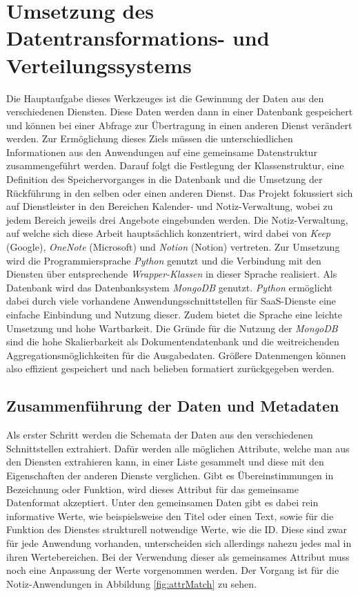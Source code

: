 \chapter{Umsetzung des Datentransformations- und Verteilungssystems}

Die Hauptaufgabe dieses Werkzeuges ist die Gewinnung der Daten aus den verschiedenen Diensten. Diese Daten werden dann in einer Datenbank gespeichert und können bei einer Abfrage zur Übertragung in einen anderen Dienst verändert werden. Zur Ermöglichung dieses Ziels müssen die unterschiedlichen Informationen aus den Anwendungen auf eine gemeinsame Datenstruktur zusammengeführt werden. Darauf folgt die Festlegung der Klassenstruktur, eine Definition des Speichervorganges in die Datenbank und die Umsetzung der Rückführung in den selben oder einen anderen Dienst. Das Projekt fokussiert sich auf Dienstleister in den Bereichen Kalender- und Notiz-Verwaltung, wobei zu jedem Bereich jeweils drei Angebote eingebunden werden. Die Notiz-Verwaltung, auf welche sich diese Arbeit hauptsächlich konzentriert, wird dabei von \textit{Keep} (Google), \textit{OneNote} (Microsoft) und \textit{Notion} (Notion) vertreten. Zur Umsetzung wird die Programmiersprache \textit{Python} genutzt und die Verbindung mit den Diensten über entsprechende \textit{Wrapper-Klassen} in dieser Sprache realisiert. Als Datenbank wird das Datenbanksystem \textit{MongoDB} genutzt. \textit{Python} ermöglicht dabei durch viele vorhandene Anwendungsschnittstellen für SaaS-Dienste eine einfache Einbindung und Nutzung dieser. Zudem bietet die Sprache eine leichte Umsetzung und hohe Wartbarkeit. Die Gründe für die Nutzung der \textit{MongoDB} sind die hohe Skalierbarkeit als Dokumentendatenbank und die weitreichenden Aggregationsmöglichkeiten für die Ausgabedaten. Größere Datenmengen können also effizient gespeichert und nach belieben formatiert zurückgegeben werden. 

\section{Zusammenführung der Daten und Metadaten}

Als erster Schritt werden die Schemata der Daten aus den verschiedenen Schnittstellen extrahiert. Dafür werden alle möglichen Attribute, welche man aus den Diensten extrahieren kann, in einer Liste gesammelt und diese mit den Eigenschaften der anderen Dienste verglichen. Gibt es Übereinstimmungen in Bezeichnung oder Funktion, wird dieses Attribut für das gemeinsame Datenformat akzeptiert. Unter den gemeinsamen Daten gibt es dabei rein informative Werte, wie beispielsweise den Titel oder einen Text, sowie für die Funktion des Dienstes strukturell notwendige Werte, wie die ID. Diese sind zwar für jede Anwendung vorhanden, unterscheiden sich allerdings nahezu jedes mal in ihren Wertebereichen. Bei der Verwendung dieser als gemeinsames Attribut muss noch eine Anpassung der Werte vorgenommen werden. Der Vorgang ist für die Notiz-Anwendungen in Abbildung \ref{fig:attrMatch} zu sehen.

